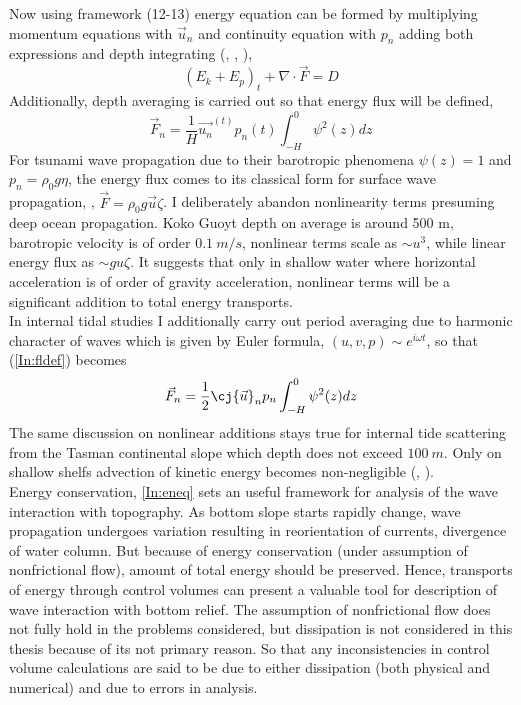 Now using framework (12-13) energy equation can be formed by multiplying momentum equations with $\vec{u}_n$ and continuity equation with $p_n$ adding both expressions and depth integrating (\cite{nekrasov1990energy}, \cite{kowalik2013oceanography}, \cite{kelly2012cascade}),
\begin{equation}
(E_k + E_p)_t + \nabla \cdot \vec{F} = D \label{In:eneq}
\end{equation}
Additionally, depth averaging is carried out so that energy flux will be defined,
\begin{equation}
\vec{F}_n = \frac{1}{H} \vec{u_n}^(t) p_n(t) \int_{-H}^0 \psi^2(z) dz \label{In:fldef}
\end{equation}
For tsunami wave propagation due to their barotropic phenomena $\psi(z) = 1$ and $p_n = \rho_0 g \eta$, the energy flux comes to its classical form for surface wave propagation, \cite{kowalik2013oceanography}, $\vec{F} = \rho_0 g \vec{u} \zeta$. I deliberately abandon nonlinearity terms presuming deep ocean propagation. Koko Guoyt depth on average is around 500 m, barotropic velocity is of order $0.1~m/s$, nonlinear terms scale as $\sim u^3$, while linear energy flux as $\sim g u \zeta$. It suggests that only in shallow water where horizontal acceleration is of order of gravity acceleration, nonlinear terms will be a significant addition to total energy transports.\\
In internal tidal studies I additionally carry out period averaging due to harmonic character of waves which is given by Euler formula, $(u,v,p) \sim e^{i \omega t}$, so that (\ref{In:fldef}) becomes
\begin{align}
\vec{F}_n = \frac{1}{2} \cj{\vec{u}}_n p_n \int_{-H}^0 \psi^2(z) dz
\end{align}
The same discussion on nonlinear additions stays true for internal tide scattering from the Tasman continental slope which depth does not exceed $100~m$. Only on shallow shelfs advection of kinetic energy becomes non-negligible (\cite{kang2012energetics}, \cite{nash2012unpredictable}).\\
Energy conservation, \ref{In:eneq} sets an useful framework for analysis of the wave interaction with topography. As bottom slope starts rapidly change, wave propagation undergoes variation resulting in reorientation of currents, divergence of water column. But because of energy conservation (under assumption of nonfrictional flow), amount of total energy should be preserved. Hence, transports of energy through control volumes can present a valuable tool for description of wave interaction with bottom relief. The assumption of nonfrictional flow does not fully hold in the problems considered, but dissipation is not considered in this thesis because of its not primary reason. So that any inconsistencies in control volume calculations are said to be due to either dissipation (both physical and numerical) and due to errors in analysis.\\
